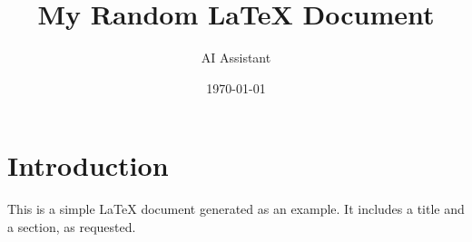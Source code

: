 \documentclass{article}
\title{My Random LaTeX Document}
\author{AI Assistant}
\date{\today}
\begin{document}
\maketitle

\section{Introduction}
This is a simple LaTeX document generated as an example. It includes a title and a section, as requested.
\end{document}
